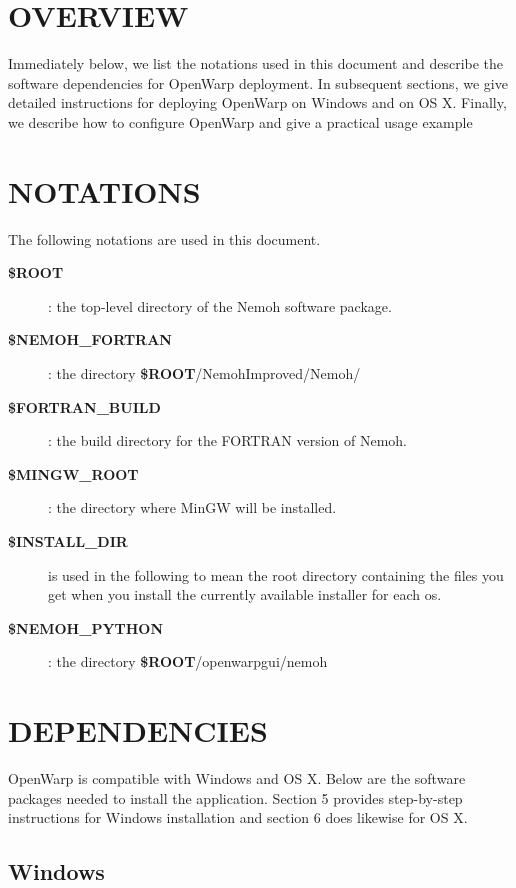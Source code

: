 \documentclass[12pt]{article}
\newcommand{\ROOT}{{\textbf{\$ROOT}}}
\newcommand{\NEMOHFORTRAN}{{\textbf{\$NEMOH{\_}FORTRAN}}}
\newcommand{\NEMOHPYTHON}{{\textbf{\$NEMOH{\_}PYTHON}}}
\newcommand{\FORTRANBUILD}{{\textbf{\$FORTRAN{\_}BUILD}}}
\newcommand{\MINGWROOT}{{\textbf{\$MINGW{\_}ROOT}}}
\newcommand{\INSTALLDIR}{{\textbf{\$INSTALL{\_}DIR}}}
\begin{document}
\section{OVERVIEW}
Immediately below, we list the notations used in this document and describe the software dependencies for OpenWarp deployment. In subsequent sections, we give detailed instructions for deploying OpenWarp on Windows and on OS X. Finally, we describe how to configure OpenWarp and give a practical usage example

\section{NOTATIONS}

The following notations are used in this document.
\begin{description}
	\item[\ROOT{}] : the top-level directory of the Nemoh software package.
	\item[\NEMOHFORTRAN]: the directory \ROOT{}/NemohImproved/Nemoh/ 
	\item[\FORTRANBUILD{}]: the build directory for the FORTRAN version of Nemoh.
	\item[\MINGWROOT]: the directory where MinGW will be installed.
	\item [\INSTALLDIR] is used in the following to mean the root directory containing the files you get when you install the currently available installer for each os.
	\item [\NEMOHPYTHON]: the directory \ROOT{}/openwarpgui/nemoh
\end{description}


\section{DEPENDENCIES}
OpenWarp is compatible with Windows and OS X.
Below are the software packages needed to install the application. Section 5 provides step-by-step instructions for Windows installation and section 6 does likewise for OS X.

\subsection{Windows}
\end{document}
